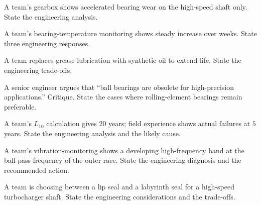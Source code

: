 \begin{exercise}
A team's gearbox shows accelerated bearing wear on the high-speed shaft only. State the engineering analysis.
\end{exercise}

\begin{exercise}
A team's bearing-temperature monitoring shows steady increase over weeks. State three engineering responses.
\end{exercise}

\begin{exercise}
A team replaces grease lubrication with synthetic oil to extend life. State the engineering trade-offs.
\end{exercise}

\begin{exercise}
A senior engineer argues that ``ball bearings are obsolete for high-precision applications.'' Critique. State the cases where rolling-element bearings remain preferable.
\end{exercise}

\begin{exercise}
A team's $L_{10}$ calculation gives $20$ years; field experience shows actual failures at $5$ years. State the engineering analysis and the likely cause.
\end{exercise}

\begin{exercise}
A team's vibration-monitoring shows a developing high-frequency band at the ball-pass frequency of the outer race. State the engineering diagnosis and the recommended action.
\end{exercise}

\begin{exercise}
A team is choosing between a lip seal and a labyrinth seal for a high-speed turbocharger shaft. State the engineering considerations and the trade-offs.
\end{exercise}
